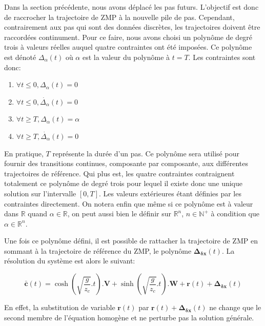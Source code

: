 Dans la section précédente, nous avons déplacé les pas
futurs. L'objectif est donc de raccrocher la trajectoire de ZMP à la
nouvelle pile de pas. Cependant, contrairement aux pas qui sont des
données discrètes, les trajectoires doivent être raccordées
continument. Pour ce faire, nous avons choisi un polynôme de degré
trois à valeurs réelles auquel quatre contraintes ont été imposées. Ce
polynôme est dénoté $\Delta_\alpha(t)$ où $\alpha$ est la valeur du
polynôme à $t=T$. Les contraintes sont donc:


\begin{enumerate}
\item $\forall t \leq 0, \Delta_\alpha(t) = 0$
\item $\forall t \leq 0, \dot{\Delta_\alpha}(t) = 0$
\item $\forall t \geq T, \Delta_\alpha(t) = \alpha$
\item $\forall t \geq T, \dot{\Delta_\alpha}(t) = 0$
\end{enumerate}

En pratique, $T$ représente la durée d'un pas. Ce polynôme sera
utilisé pour fournir des transitions continues, composante par
composante, aux différentes trajectoires de référence. Qui plus est,
les quatre contraintes contraignent totalement ce polynôme de degré
trois pour lequel il existe donc une unique solution sur l'intervalle
$[0,T]$. Les valeurs extérieures étant définies par les contraintes
directement. On notera enfin que même si ce polynôme est à valeur dans
$\mathbb{R}$ quand $\alpha \in \mathbb{R}$, on peut aussi bien le
définir sur $\mathbb{R}^n$, $n \in \mathbb{N}^+$ à condition que
$\alpha \in \mathbb{R}^n$.


Une fois ce polynôme défini, il est possible de rattacher la
trajectoire de ZMP en sommant à la trajectoire de référence du
ZMP, le polynôme
$\mathbf{\Delta}_{\mathbf{\delta {x}}}(t)$. La résolution du système
est alors le suivant:

\begin{equation} \label{eq:zmpsolcor}
  \bar{\mathbf{c}}(t) = \cosh(\sqrt{\frac{g}{z_c}}.t) . \mathbf{V} +
  \sinh(\sqrt{\frac{g}{z_c}}.t) . \mathbf{W} + \mathbf{r}(t) + \mathbf{\Delta}_{\mathbf{\delta {x}}}(t)
\end{equation}

En effet, la substitution de variable $\mathbf{r}(t)$ par
$\mathbf{r}(t) + \mathbf{\Delta}_{\mathbf{\delta {x}}}(t)$ ne change
que le second membre de l'équation homogène et ne perturbe pas la
solution générale.

